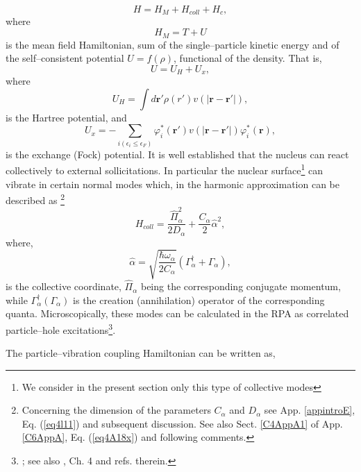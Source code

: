 \begin{equation}\label{eqn:30}
H = H_M  + H_{coll} + H_{c} ,
\end{equation}
where
\begin{equation}\label{eq1.3.2}
H_M=T+U
\end{equation}
is the mean field Hamiltonian, sum of the single--particle kinetic energy and of the self--consistent potential $U=f(\rho)$, functional of the  density. That is,
\begin{equation}
U=U_H+U_x,
\end{equation}
where
\begin{equation}
U_H=\int d\mathbf r'\rho(r')v(|\mathbf r- \mathbf r'|),
\end{equation}
is the Hartree potential, and
\begin{equation}
U_x=-\sum_{i(\epsilon_i\leq\epsilon_F)}\varphi_i^*(\mathbf r')v(|\mathbf r- \mathbf r'|)\varphi_i^*(\mathbf r),
\end{equation}
is the exchange (Fock) potential. It is well established that the nucleus can react collectively to external sollicitations. In particular the nuclear surface\footnote{We consider in the present section only this type of collective modes} can vibrate in certain normal modes which, in the harmonic approximation can be described as \footnote{Concerning the dimension of the parameters $C_\alpha$ and $D_\alpha$ see App. \ref{appintroE}, Eq. (\ref{eq4l11}) and subsequent discussion. See also Sect. \ref{C4AppA1} of App. \ref{C6AppA}, Eq. (\ref{eq4A18x}) and following comments.}
 \begin{equation}
H_{coll}=\frac{\hat\Pi_\alpha^2}{2D_\alpha}+\frac{C_\alpha}{2}\hat\alpha^2,
 \end{equation}
 where,  
 \begin{equation}
\hat\alpha=\sqrt{\frac{\hbar \omega_\alpha}{2C_\alpha}}\left(\Gamma^\dagger_\alpha+\Gamma_\alpha\right),
 \end{equation}
 is the collective coordinate, $\hat\Pi_\alpha$ being the corresponding conjugate momentum, while $\Gamma^\dagger_\alpha(\Gamma_\alpha)$ is the creation (annihilation) operator of the corresponding quanta. Microscopically, these modes can be calculated in the RPA as correlated particle--hole excitations\footnote{\cite{Bohm:51,Bohm:52,Bohm:53}; see also \cite{Bertsch:05}, Ch. 4 and refs. therein.}.
 
 
 
The particle--vibration coupling Hamiltonian can be written as,

